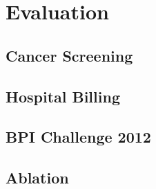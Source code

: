 %
\chapter{Evaluation}

\section{Cancer Screening}

\section{Hospital Billing}

\section{BPI Challenge 2012}

\section{Ablation}